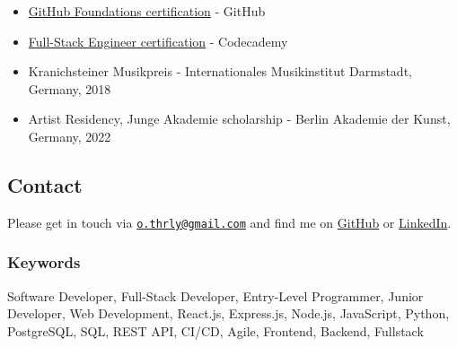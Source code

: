 \documentclass[10pt,a4paper]{article}
\providecommand{\tightlist}{%
  \setlength{\itemsep}{0pt}\setlength{\parskip}{0pt}}
\begin{document}
\begin{itemize}
\tightlist
\item
  \href{https://www.credly.com/badges/8f2ca183-49d2-426a-8483-cbdb8f4efdbd/public_url}{GitHub
  Foundations certification} - GitHub
\item
  \href{https://www.codecademy.com/profiles/thrly/certificates/ffd0f42cce1a44e9a0108b365047a0a6}{Full-Stack
  Engineer certification} - Codecademy
\item
  Kranichsteiner Musikpreis - Internationales Musikinstitut Darmstadt,
  Germany, 2018
\item
  Artist Residency, Junge Akademie scholarship - Berlin Akademie der
  Kunst, Germany, 2022
\end{itemize}

\subsection{Contact}\label{contact}

Please get in touch via
\href{mailto:o.thrly@gmail.com}{\nolinkurl{o.thrly@gmail.com}} and find
me on \href{https://github.com/thrly}{GitHub} or
\href{https://www.linkedin.com/in/oliver-thurley}{LinkedIn}.

\subsubsection{Keywords}\label{keywords}

Software Developer, Full-Stack Developer, Entry-Level Programmer, Junior
Developer, Web Development, React.js, Express.js, Node.js, JavaScript,
Python, PostgreSQL, SQL, REST API, CI/CD, Agile, Frontend, Backend,
Fullstack
\end{document}
